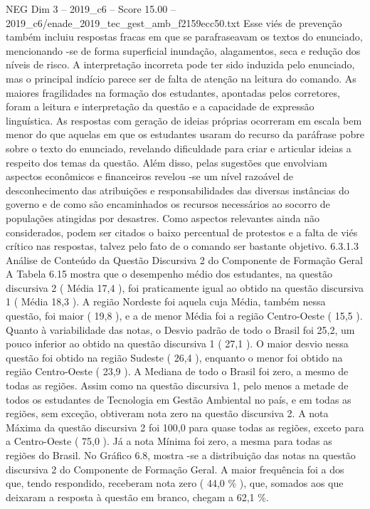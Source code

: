 \begin{textsample}{NEG Dim 3 – 2019\_c6 – Score 15.00 – 2019\_c6/enade\_2019\_tec\_gest\_amb\_f2159ecc50.txt}
Esse viés de prevenção também incluiu respostas fracas em que se parafraseavam os textos do enunciado, mencionando -se de forma superficial inundação, alagamentos, seca e redução dos níveis de risco.
A interpretação incorreta pode ter sido induzida pelo enunciado, mas o principal indício parece ser de falta de atenção na leitura do comando.
As maiores fragilidades na formação dos estudantes, apontadas pelos corretores, foram a leitura e interpretação da questão e a capacidade de expressão linguística.
As respostas com geração de ideias próprias ocorreram em escala bem menor do que aquelas em que os estudantes usaram do recurso da paráfrase pobre sobre o texto do enunciado, revelando dificuldade para criar e articular ideias a respeito dos temas da questão.
Além disso, pelas sugestões que envolviam aspectos econômicos e financeiros revelou -se um nível razoável de desconhecimento das atribuições e responsabilidades das diversas instâncias do governo e de como são encaminhados os recursos necessários ao socorro de populações atingidas por desastres.
Como aspectos relevantes ainda não considerados, podem ser citados o baixo percentual de protestos e a falta de viés crítico nas respostas, talvez pelo fato de o comando ser bastante objetivo. 6.3.1.3 Análise de Conteúdo da Questão Discursiva 2 do Componente de Formação Geral A Tabela 6.15 mostra que o desempenho médio dos estudantes, na questão discursiva 2 ( Média 17,4 ), foi praticamente igual ao obtido na questão discursiva 1 ( Média 18,3 ).
A região Nordeste foi aquela cuja Média, também nessa questão, foi maior ( 19,8 ), e a de menor Média foi a região Centro-Oeste ( 15,5 ).
Quanto à variabilidade das notas, o Desvio padrão de todo o Brasil foi 25,2, um pouco inferior ao obtido na questão discursiva 1 ( 27,1 ).
O maior desvio nessa questão foi obtido na região Sudeste ( 26,4 ), enquanto o menor foi obtido na região Centro-Oeste ( 23,9 ).
A Mediana de todo o Brasil foi zero, a mesmo de todas as regiões.
Assim como na questão discursiva 1, pelo menos a metade de todos os estudantes de Tecnologia em Gestão Ambiental no país, e em todas as regiões, sem exceção, obtiveram nota zero na questão discursiva 2.
A nota Máxima da questão discursiva 2 foi 100,0 para quase todas as regiões, exceto para a Centro-Oeste ( 75,0 ).
Já a nota Mínima foi zero, a mesma para todas as regiões do Brasil.
No Gráfico 6.8, mostra -se a distribuição das notas na questão discursiva 2 do Componente de Formação Geral.
A maior frequência foi a dos que, tendo respondido, receberam nota zero ( 44,0 \% ), que, somados aos que deixaram a resposta à questão em branco, chegam a 62,1 \%.

\end{textsample}
